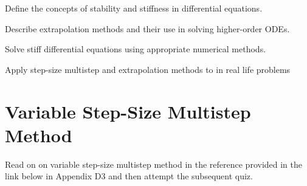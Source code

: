 \begin{mlos}
\item Define the concepts of stability and stiffness in differential equations.
\item Describe extrapolation methods and their use in solving higher-order ODEs.
\item Solve stiff differential equations using appropriate numerical methods.
\item Apply step-size multistep and extrapolation methods to in real life problems 
\end{mlos}

\section{Variable Step-Size Multistep Method}
\activities
Read on on variable step-size multistep method in the reference provided in the link below in Appendix D3 and then attempt the subsequent quiz.
\begin{activity}[\cg Reading]
\end{activity}
